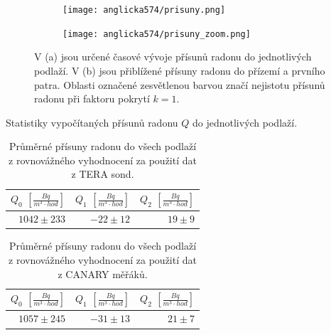 \begin{figure}[ht]
    \begin{subfigure}{\textwidth}
        \centering
        \texttt{[image: anglicka574/prisuny.png]}
        \caption{}
        \label{fig:anglicka574_prisuny}
    \end{subfigure}
    \begin{subfigure}{\textwidth}
        \centering
        \texttt{[image: anglicka574/prisuny\_zoom.png]}
        \caption{}
        \label{fig:anglicka574_prisunyZoom}
    \end{subfigure}
    \caption{V (a) jsou určené časové vývoje přísunů radonu do jednotlivých podlaží. V (b) jsou přiblížené přísuny radonu do přízemí a prvního patra. Oblasti označené zesvětlenou barvou značí nejistotu přísunů radonu při faktoru pokrytí $k=1$.}
\end{figure}
\begin{table}[H]
    \centering
    \caption{Statistiky vypočítaných přísunů radonu $Q$ do jednotlivých podlaží.}
    \label{tab:anglicka574_prisuny}
    
\end{table}
\begin{table}[H]
    \centering
    \caption{Průměrné přísuny radonu do všech podlaží z rovnovážného vyhodnocení za použití dat z TERA sond.}
    \label{tab:anglicka574_prisunyRovnovazne}
    \begin{tabular}{rrr}
        \toprule
        $Q_0$ $\left[\si{\frac{Bq}{m^3\cdot hod}}\right]$& $Q_1$ $\left[\si{\frac{Bq}{m^3\cdot hod}}\right]$ & $Q_2$ $\left[\si{\frac{Bq}{m^3\cdot hod}}\right]$\\
        \midrule
        $1042\pm233$ & $-22\pm12$ & $19\pm9$\\
        \bottomrule
    \end{tabular}
\end{table}
\begin{table}[H]
    \centering
    \caption{Průměrné přísuny radonu do všech podlaží z rovnovážného vyhodnocení za použití dat z CANARY měřáků.}
    \label{tab:anglicka574_prisunyRovnovazneCANARY}
    \begin{tabular}{rrr}
        \toprule
        $Q_0$ $\left[\si{\frac{Bq}{m^3\cdot hod}}\right]$& $Q_1$ $\left[\si{\frac{Bq}{m^3\cdot hod}}\right]$ & $Q_2$ $\left[\si{\frac{Bq}{m^3\cdot hod}}\right]$\\
        \midrule
        $1057\pm245$ & $-31\pm13$ & $21\pm7$\\
        \bottomrule
    \end{tabular}
\end{table}

